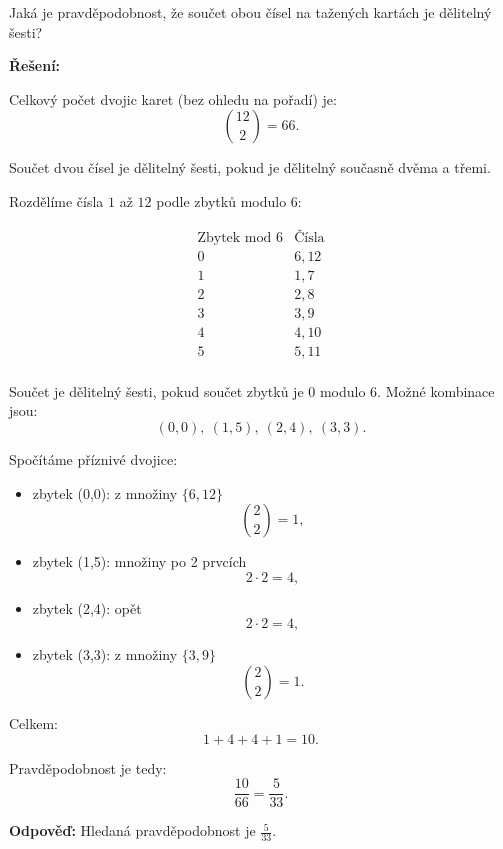 \documentclass[12pt,a4paper]{article}
\begin{document}
Jaká je pravděpodobnost, že součet obou čísel na tažených kartách je dělitelný šesti?

\bigskip

\textbf{Řešení:}

Celkový počet dvojic karet (bez ohledu na pořadí) je:
\[
\binom{12}{2}=66.
\]

\medskip

Součet dvou čísel je dělitelný šesti, pokud je dělitelný současně dvěma a třemi.

Rozdělíme čísla \(1\) až \(12\) podle zbytků modulo 6:

\[
\begin{array}{c|c}
\text{Zbytek mod 6} & \text{Čísla} \\
\hline
0 & 6, 12 \\
1 & 1, 7 \\
2 & 2, 8 \\
3 & 3, 9 \\
4 & 4, 10 \\
5 & 5, 11 \\
\end{array}
\]

Součet je dělitelný šesti, pokud součet zbytků je 0 modulo 6. Možné kombinace jsou:
\[
(0,0),\ (1,5),\ (2,4),\ (3,3).
\]

\medskip

Spočítáme příznivé dvojice:

\begin{itemize}
    \item zbytek (0,0): z množiny \(\{6,12\}\)
    \[
    \binom{2}{2}=1,
    \]
    
    \item zbytek (1,5): množiny po 2 prvcích
    \[
    2\cdot 2=4,
    \]
    
    \item zbytek (2,4): opět
    \[
    2\cdot 2=4,
    \]
    
    \item zbytek (3,3): z množiny \(\{3,9\}\)
    \[
    \binom{2}{2}=1.
    \]
\end{itemize}

Celkem:
\[
1+4+4+1=10.
\]

\medskip

Pravděpodobnost je tedy:
\[
\frac{10}{66}=\frac{5}{33}.
\]

\bigskip

\textbf{Odpověď:}  
Hledaná pravděpodobnost je \(\frac{5}{33}\).
\end{document}
